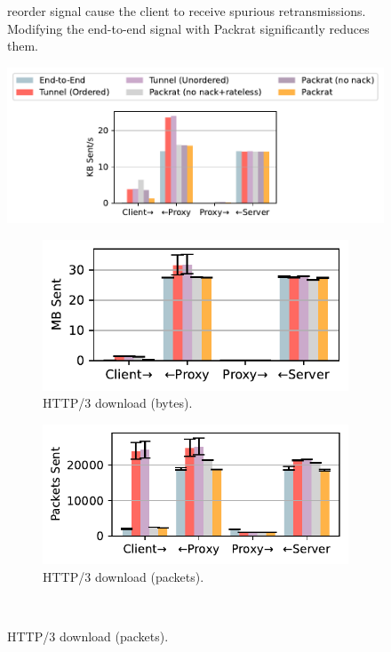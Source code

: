 \begin{figure}[ht]
\begin{minipage}[t]{0.3\textwidth}
{     reorder signal cause the client to receive spurious retransmissions.
     Modifying the end-to-end signal with Packrat significantly reduces them.}
    \label{fig:spurious}
\end{minipage}%
\hfill
\begin{minipage}[t]{0.68\textwidth}
    \centering
    \includegraphics[width=0.9\linewidth, trim=5 140 5 5, clip]{packrat-paper/figures/network_stats_media_legend.pdf}
    
    \begin{subfigure}[b]{0.48\linewidth}
        \centering
        \includegraphics[width=\linewidth]{packrat-paper/figures/network_stats_http_tx_bytes.pdf}
        \caption{HTTP/3 download (bytes).}
        \label{fig:link-overheads:http-bytes}
    \end{subfigure}
    \begin{subfigure}[b]{0.51\linewidth}
        \centering
        \includegraphics[width=\linewidth]{packrat-paper/figures/network_stats_http_tx_packets.pdf}
        \caption{HTTP/3 download (packets).}
        \label{fig:link-overheads:http-packets}
    \end{subfigure}\\


\end{minipage}
\end{figure}
